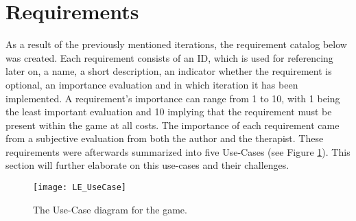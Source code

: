 \documentclass[draft,final]{vutinfth} %
\begin{document}
\section{Requirements}
\label{sec:Features}
As a result of the previously mentioned iterations, the requirement catalog below was created. Each requirement consists of an ID, which is used for referencing later on, a name, a short description, an indicator whether the requirement is optional, an importance evaluation and in which iteration it has been implemented. A requirement's importance can range from 1 to 10, with 1 being the least important evaluation and 10 implying that the requirement must be present within the game at all costs. The importance of each requirement came from a subjective evaluation from both the author and the therapist. These requirements were afterwards summarized into five Use-Cases (see  Figure \ref{fig:UseCase}). This section will further elaborate on this use-cases and their challenges.

\begin{figure}
\begin{center}
\texttt{[image: LE\_UseCase]}
\end{center}
\caption{The Use-Case diagram for the game.}
\label{fig:UseCase}
\end{figure}
\end{document}
